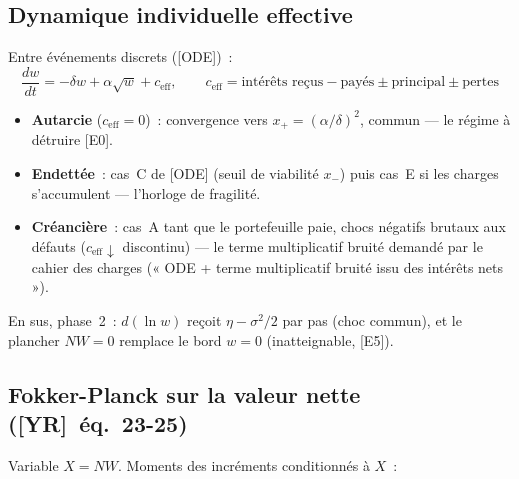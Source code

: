 \documentclass[11pt,a4paper]{article}
\newcommand{\NW}{\mathit{NW}}
\begin{document}
\subsection{Dynamique individuelle effective}
\label{sec:dynamique-individuelle}

Entre événements discrets ([ODE])~:
\[
  \frac{dw}{dt} = -\delta w + \alpha\sqrt{w} + c_{\mathrm{eff}}, \qquad
  c_{\mathrm{eff}} = \text{intérêts reçus} - \text{payés} \pm \text{principal} \pm \text{pertes}
\]

\begin{itemize}
  \item \textbf{Autarcie} ($c_{\mathrm{eff}}=0$)~: convergence vers $x_+ = (\alpha/\delta)^2$, commun --- le régime à détruire [E0].
  \item \textbf{Endettée}~: cas~C de [ODE] (seuil de viabilité $x_-$) puis cas~E si les charges s'accumulent --- l'horloge de fragilité.
  \item \textbf{Créancière}~: cas~A tant que le portefeuille paie, chocs négatifs brutaux aux défauts ($c_{\mathrm{eff}}\downarrow$ discontinu) --- le terme multiplicatif bruité demandé par le cahier des charges (« ODE + terme multiplicatif bruité issu des intérêts nets »).
\end{itemize}

En sus, phase~2~: $d(\ln w)$ reçoit $\eta - \sigma^2/2$ par pas (choc commun), et le plancher $\NW=0$ remplace le bord $w=0$ (inatteignable, [E5]).

\subsection{Fokker-Planck sur la valeur nette ([YR]~éq.~23-25)}
\label{sec:fokker-planck}

Variable $X=\NW$. Moments des incréments conditionnés à $X$~:
\end{document}

